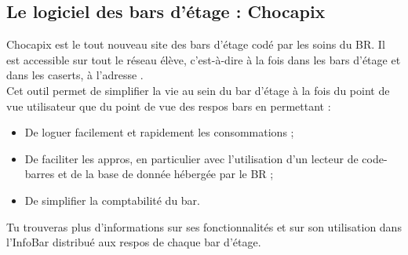 \subsection{Le logiciel des bars d'étage : Chocapix}
\label{chocapix}

Chocapix est le tout nouveau site des bars d'étage codé par les soins du BR. Il est accessible sur tout le réseau élève, c'est-à-dire à la fois dans les bars d'étage et dans les caserts, à l'adresse .\\
Cet outil permet de simplifier la vie au sein du bar d'étage à la fois du point de vue utilisateur que du point de vue des respos bars en permettant :
\begin{itemize}
\item De loguer facilement et rapidement les consommations ;
\item De faciliter les appros, en particulier avec l'utilisation d'un lecteur de code-barres et de la base de donnée hébergée par le BR ;
\item De simplifier la comptabilité du bar.\\
\end{itemize}
Tu trouveras plus d'informations sur ses fonctionnalités et sur son utilisation dans l'InfoBar distribué aux respos de chaque bar d'étage.
